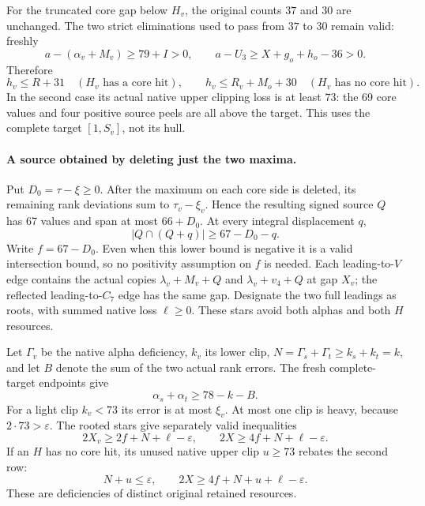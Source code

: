 For the truncated core gap below $H_v$, the original counts $37$ and
$30$ are unchanged. The two strict eliminations used to pass from
$37$ to $30$ remain valid: freshly
\[
 a-(\alpha_v+M_v)\ge79+I>0,\qquad
 a-U_3\ge X+g_o+h_o-36>0.
\]
Therefore
\begin{equation}\label{eq:85-ownerless-H}
 h_v\le R+31\quad(H_v\text{ has a core hit}),\qquad
 h_v\le R_v+M_o+30\quad(H_v\text{ has no core hit}).
\end{equation}
In the second case its actual native upper clipping loss is at least
$73$: the 69 core values and four positive source peels are all above
the target. This uses the complete target $[1,S_v]$, not its hull.

\paragraph{A source obtained by deleting just the two maxima.}
Put $D_0=\tau-\xi\ge0$. After the maximum on each core side is
deleted, its remaining rank deviations sum to $\tau_v-\xi_v$.
Hence the resulting signed source $Q$ has 67 values and span at most
$66+D_0$. At every integral displacement $q$,
\[
 |Q\cap(Q+q)|\ge67-D_0-q.
\]
Write $f=67-D_0$. Even when this lower bound is negative it is a valid
intersection bound, so no positivity assumption on $f$ is needed.
Each leading-to-$V$ edge contains the actual copies
$\lambda_v+M_v+Q$ and $\lambda_v+v_4+Q$ at gap $X_v$;
the reflected leading-to-$C_7$ edge has the same gap.
Designate the two full leadings as roots, with summed native loss
$\ell\ge0$. These stars avoid both alphas and both $H$ resources.

Let $\Gamma_v$ be the native alpha deficiency, $k_v$ its lower clip,
$N=\Gamma_s+\Gamma_t\ge k_s+k_t=k$, and let $B$ denote the sum of
the two actual rank errors. The fresh complete-target endpoints give
\[
 \alpha_s+\alpha_t\ge78-k-B.
\]
For a light clip $k_v<73$ its error is at most $\xi_v$.
At most one clip is heavy, because $2\cdot73>\varepsilon$.
The rooted stars give separately valid inequalities
\begin{equation}\label{eq:85-ownerless-stars}
 2X_v\ge2f+N+\ell-\varepsilon,\qquad
 2X\ge4f+N+\ell-\varepsilon.
\end{equation}
If an $H$ has no core hit, its unused native upper clip $u\ge73$
rebates the second row:
\begin{equation}\label{eq:85-ownerless-stars-H}
 N+u\le\varepsilon,\qquad
 2X\ge4f+N+u+\ell-\varepsilon.
\end{equation}
These are deficiencies of distinct original retained resources.

